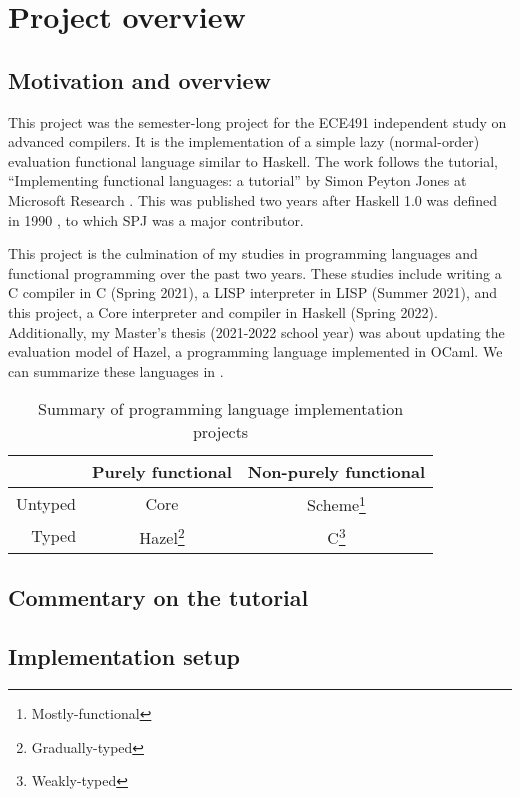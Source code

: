 \section{Project overview}
\label{sec:overview}

\subsection{Motivation and overview}
\label{sec:motivation}

This project was the semester-long project for the ECE491 independent study on advanced compilers. It is the implementation of a simple lazy (normal-order) evaluation functional language similar to Haskell. The work follows the tutorial, ``Implementing functional languages: a tutorial'' by Simon Peyton Jones at Microsoft Research \cite{jones2000implementing}. This was published two years after Haskell 1.0 was defined in 1990 \cite{hudak2007history}, to which SPJ was a major contributor.

This project is the culmination of my studies in programming languages and functional programming over the past two years. These studies include writing a C compiler in C (Spring 2021), a LISP interpreter in LISP (Summer 2021), and this project, a Core interpreter and compiler in Haskell (Spring 2022). Additionally, my Master's thesis (2021-2022 school year) was about updating the evaluation model of Hazel, a programming language implemented in OCaml. We can summarize these languages in .

\begin{table}
  \centering
  \begin{tabular}{r|c|c}
    & Purely functional & Non-purely functional \\
    \hline
    Untyped & Core & Scheme\footnote{Mostly-functional} \\
    Typed & Hazel\footnote{Gradually-typed} & C\footnote{Weakly-typed}
  \end{tabular}
  \caption{Summary of programming language implementation projects}
  \label{tab:pl-implementations-summary}
\end{table}

\subsection{Commentary on the tutorial}
\label{sec:tutorial-commentary}

\subsection{Implementation setup}
\label{sec:implementation-setup}

